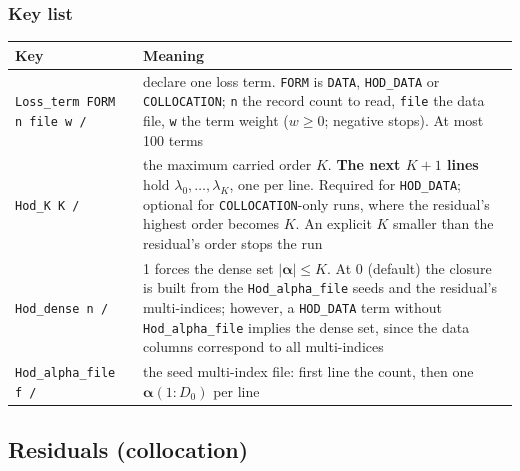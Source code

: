 \documentclass[10pt,a4paper]{article}
\newcommand{\code}[1]{\texttt{#1}}
\newcommand{\mi}[1]{\boldsymbol{#1}}
\begin{document}
\subsubsection{Key list}

\begin{longtable}{@{}p{}p{}@{}}
\toprule
Key & Meaning \\
\midrule
\endhead
\code{Loss\_term FORM n file w /} & declare one loss term. \code{FORM} is \code{DATA}, \code{HOD\_DATA} or \code{COLLOCATION}; \code{n} the record count to read, \code{file} the data file, \code{w} the term weight ($w\ge 0$; negative stops). At most 100 terms\\
\code{Hod\_K K /} & the maximum carried order $K$. \textbf{The next $K+1$ lines} hold $\lambda_0,\dots,\lambda_K$, one per line. Required for \code{HOD\_DATA}; optional for \code{COLLOCATION}-only runs, where the residual's highest order becomes $K$. An explicit $K$ smaller than the residual's order stops the run\\
\code{Hod\_dense n /} & 1 forces the dense set $|\mi\alpha|\le K$. At 0 (default) the closure is built from the \code{Hod\_alpha\_file} seeds and the residual's multi-indices; however, a \code{HOD\_DATA} term without \code{Hod\_alpha\_file} implies the dense set, since the data columns correspond to all multi-indices\\
\code{Hod\_alpha\_file f /} & the seed multi-index file: first line the count, then one $\mi\alpha(1{:}D_0)$ per line\\
\bottomrule
\end{longtable}

\subsection{Residuals (collocation)}
\end{document}
